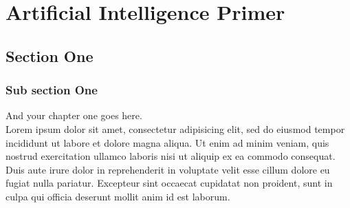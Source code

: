 \chapter{Artificial Intelligence Primer}%
\label{chap:chap2}

\section{Section One}
\label{section:chap2:sec1}

  \subsection{Sub section One}
  And your chapter one goes here\cite{web001}\@. ~\\
  Lorem ipsum dolor sit amet, consectetur adipisicing elit, sed do eiusmod
  tempor incididunt ut labore et dolore magna aliqua. Ut enim ad minim veniam,
  quis nostrud exercitation ullamco laboris nisi ut aliquip ex ea commodo
  consequat. Duis aute irure dolor in reprehenderit in voluptate velit esse
  cillum dolore eu fugiat nulla pariatur. Excepteur sint occaecat cupidatat non
  proident, sunt in culpa qui officia deserunt mollit anim id est laborum.




